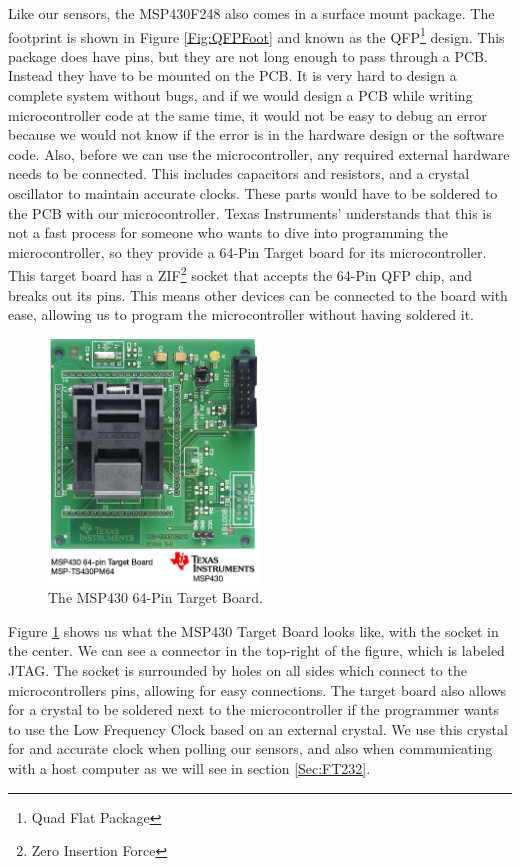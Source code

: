 Like our sensors, the MSP430F248 also comes in a surface mount package.
The footprint is shown in Figure \ref{Fig:QFPFoot}
and known as the QFP\footnote{Quad Flat Package} design.
This package does have pins, but they are not long enough to pass through a PCB.
Instead they have to be mounted on the PCB.
It is very hard to design a complete system without bugs, and if we would design a PCB
while writing microcontroller code at the same time,
it would not be easy to debug an error because we would not know if the error
is in the hardware design or the software code.
Also, before we can use the microcontroller,
any required external hardware needs to be connected.
This includes capacitors and resistors,
and a crystal oscillator to maintain accurate clocks.
These parts would have to be soldered to the PCB with our microcontroller.
Texas Instruments' understands that this is not a fast process for someone who wants to dive into programming the microcontroller,
so they provide a 64-Pin Target board for its microcontroller. This target board has
a ZIF\footnote{Zero Insertion Force} socket that accepts the 64-Pin QFP chip,
and breaks out its pins. This means other devices can be connected to the board with ease,
allowing us to program the microcontroller without having soldered it.
\begin{figure}
\begin{center}
\includegraphics[width=0.5\textwidth]{images/mspts430pm64.jpg}
\caption{The MSP430 64-Pin Target Board.}
\label{Fig:MSPTarget}
\end{center}
\end{figure}

Figure \ref{Fig:MSPTarget} shows us what the MSP430 Target Board \cite{Web:MSPTarget} looks like, with the socket in the center. We can see a connector in the top-right of the figure, which is labeled JTAG. The socket is surrounded by holes on all sides which connect to the microcontrollers pins, allowing for easy connections. The target board also allows for a crystal to be soldered next to the microcontroller if the programmer wants to use the Low Frequency Clock based on an external crystal. We use this crystal for and accurate clock when polling our sensors, and also when communicating with a host computer as we will see in section \ref{Sec:FT232}.

